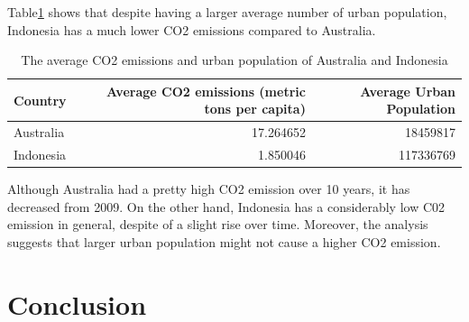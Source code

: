 \documentclass[11pt,a4paper,]{article}
\begin{document}
Table\ref{tab:urbanvsco2} shows that despite having a larger average number of urban population, Indonesia has a much lower CO2 emissions compared to Australia.

\begin{table}[!h]

\caption{\label{tab:urbanvsco2}The average CO2 emissions and urban population of Australia and Indonesia}
\centering
\begin{tabular}[t]{l|r|r}
\hline
Country & Average CO2 emissions (metric tons per capita) & Average Urban Population\\
\hline
Australia & 17.264652 & 18459817\\
\hline
Indonesia & 1.850046 & 117336769\\
\hline
\end{tabular}
\end{table}

Although Australia had a pretty high CO2 emission over 10 years, it has decreased from 2009. On the other hand, Indonesia has a considerably low C02 emission in general, despite of a slight rise over time. Moreover, the analysis suggests that larger urban population might not cause a higher CO2 emission.

\clearpage

\section*{Conclusion}
\end{document}
